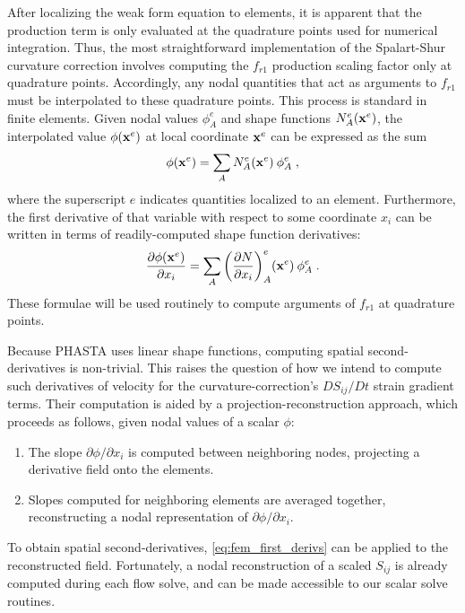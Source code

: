 \documentclass[11pt]{article}
\begin{document}
After localizing the weak form equation to elements, it is apparent that the production term is only evaluated at the quadrature points used for numerical integration. Thus, the most straightforward implementation of the Spalart-Shur curvature correction involves computing the $f_{r1}$ production scaling factor only at quadrature points. Accordingly, any nodal quantities that act as arguments to $f_{r1}$ must be interpolated to these quadrature points. This process is standard in finite elements. Given nodal values $\phi_A^e$ and shape functions $N^e_A(\mb{x}^e)$, the interpolated value $\phi(\mb{x}^e)$ at local coordinate $\mb{x}^e$ can be expressed as the sum
\begin{equation}
\phi(\mb{x}^e) = \sum_A N^e_A(\mb{x}^e) \: \phi_A^e
\;,
\end{equation}
where the superscript $e$ indicates quantities localized to an element. Furthermore, the first derivative of that variable with respect to some coordinate $x_i$ can be written in terms of readily-computed shape function derivatives:
\begin{equation}
\pp{\phi(\mb{x}^e)}{x_i} = \sum_A \left(\pp{N}{x_i}\right)^e_A \! (\mb{x}^e) \: \phi_A^e
\;.
\label{eq:fem_first_derivs}
\end{equation}
These formulae will be used routinely to compute arguments of $f_{r1}$ at quadrature points.

Because PHASTA uses linear shape functions, computing spatial second-derivatives is non-trivial. This raises the question of how we intend to compute such derivatives of velocity for the curvature-correction's $D S_{ij} / D t$ strain gradient terms.  Their computation is aided by a projection-reconstruction approach, which proceeds as follows, given nodal values of a scalar $\phi$:
\begin{enumerate}
\item The slope $\partial \phi / \partial x_i$ is computed between neighboring nodes, projecting a derivative field onto the elements.
\item Slopes computed for neighboring elements are averaged together, reconstructing a nodal representation of $\partial \phi / \partial x_i$.
\end{enumerate}
To obtain spatial second-derivatives, \eqref{eq:fem_first_derivs} can be applied to the reconstructed field. Fortunately, a nodal reconstruction of a scaled $S_{ij}$ is already computed during each flow solve, and can be made accessible to our scalar solve routines.
\end{document}
